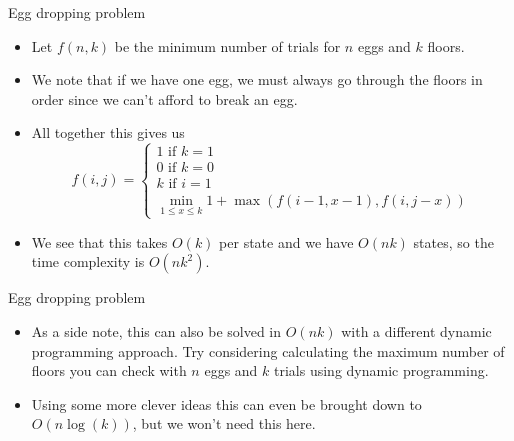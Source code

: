 \documentclass{beamer}
\begin{document}
\begin{frame}[plain]{Egg dropping problem}
    \vspace{10pt}

    \begin{itemize}
        \item Let $f(n, k)$ be the minimum number of trials for $n$ eggs and $k$ floors. 
        \item We note that if we have one egg, we must always go through the floors in order since we can't afford to break an egg.
        \item All together this gives us
        \[f(i, j) = \begin{cases}1 \text{ if } k = 1 \\0 \text{ if } k = 0\\k \text{ if } i = 1\\ \min_{1 \leq x \leq k} 1 + \max(f(i - 1, x - 1), f(i, j - x))\end{cases}\]
        \item We see that this takes $O(k)$ per state and we have $O(nk)$ states, so the time complexity is $O(nk^2)$.
    \end{itemize}
\end{frame}

\begin{frame}[plain]{Egg dropping problem}
    \vspace{10pt}

    \begin{itemize}
        \item As a side note, this can also be solved in $O(nk)$ with a different dynamic programming approach. Try considering calculating the maximum number of floors you can check with $n$ eggs and $k$ trials using dynamic programming.
        
        \item Using some more clever ideas this can even be brought down to $O(n\log(k))$, but we won't need this here.
    \end{itemize}
\end{frame}

\end{document}
